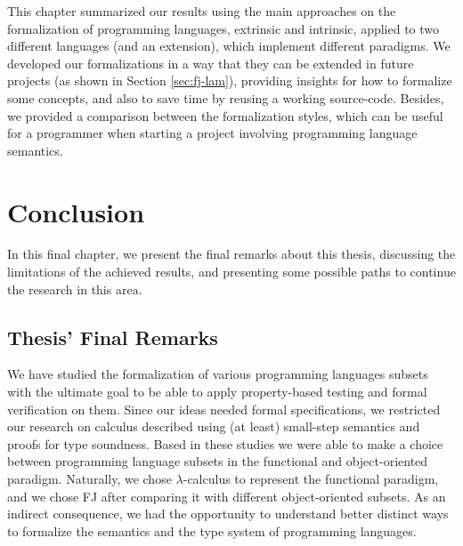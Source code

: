 \documentclass[tese,capa,english]{texufpel}
\begin{document}
This chapter summarized our results using the main approaches on the formalization of programming languages, extrinsic and intrinsic, applied to two different languages (and an extension), which implement different paradigms. We developed our formalizations in a way that they can be extended in future projects (as shown in Section \ref{sec:fj-lam}), providing insights for how to formalize some concepts, and also to save time by reusing a working source-code. Besides, we provided a comparison between the formalization styles, which can be useful for a programmer when starting a project involving programming language semantics. 

\chapter{Conclusion}
\label{chap:conclusion}

In this final chapter, we present the final remarks about this thesis, discussing the limitations of the achieved results, and presenting some possible paths to continue the research in this area.

\section{Thesis' Final Remarks}

We have studied the formalization of various programming languages subsets with the ultimate goal to be able to apply property-based testing and formal verification on them. Since our ideas needed formal specifications, we restricted our research on calculus described using (at least) small-step semantics and proofs for type soundness. Based in these studies we were able to make a choice between programming language subsets in the functional and object-oriented paradigm. Naturally, we chose $\lambda$-calculus to represent the functional paradigm, and we chose FJ after comparing it with different object-oriented subsets. As an indirect consequence, we had the opportunity to understand better distinct ways to formalize the semantics and the type system of programming languages.
\end{document}
